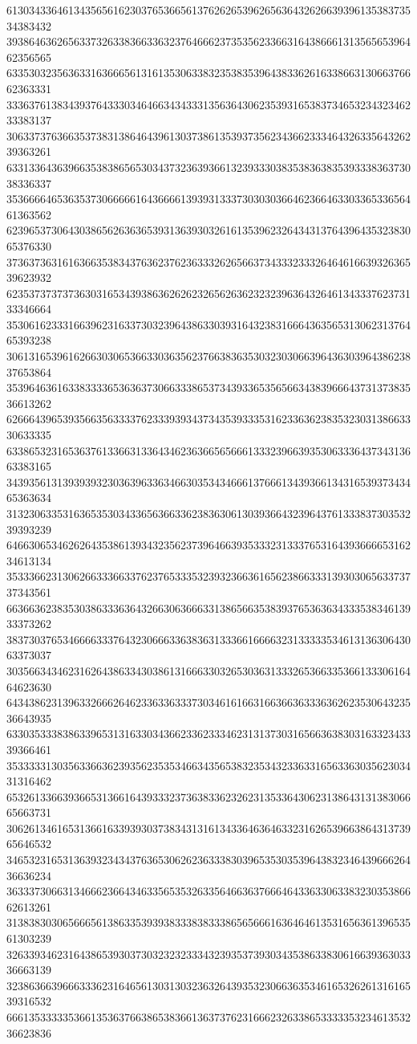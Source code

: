 61303433646134356561623037653665613762626539626563643262663939613538373534383432
39386463626563373263383663363237646662373535623366316438666131356565396462356565
63353032356363316366656131613530633832353835396438336261633866313066376662363331
33363761383439376433303464663434333135636430623539316538373465323432346233383137
30633737636635373831386464396130373861353937356234366233346432633564326239363261
63313364363966353838656530343732363936613239333038353836383539333836373038336337
35366664653635373066666164366661393931333730303036646236646330336533656461363562
62396537306430386562636365393136393032616135396232643431376439643532383065376330
37363736316163663538343763623762363332626566373433323332646461663932636539623932
62353737373736303165343938636262623265626362323239636432646134333762373133346664
35306162333166396231633730323964386330393164323831666436356531306231376465393238
30613165396162663030653663303635623766383635303230306639643630396438623837653864
35396463616338333365363637306633386537343933653565663438396664373137383536613262
62666439653935663563333762333939343734353933353162336362383532303138663330633335
63386532316536376133663133643462363665656661333239663935306333643734313663383165
34393561313939393230363963363466303534346661376661343936613431653937343465363634
31323063353163653530343365636633623836306130393664323964376133383730353239393239
64663065346262643538613934323562373964663935333231333765316439366665316234613134
35333662313062663336633762376533353239323663616562386633313930306563373737343561
66366362383530386333636432663063666331386566353839376536363433353834613933373262
38373037653466663337643230666336383631333661666632313333353461313630643063373037
30356634346231626438633430386131666330326530363133326536633536613330616464623630
64343862313963326662646233633633373034616166316636636333636262353064323536643935
63303533383863396531316330343662336233346231313730316566363830316332343339366461
35333331303563366362393562353534663435653832353432336331656336303562303431316462
65326133663936653136616439333237363833623262313533643062313864313138306665663731
30626134616531366163393930373834313161343364636463323162653966386431373965646532
34653231653136393234343763653062623633383039653530353964383234643966626436636234
36333730663134666236643463356535326335646636376664643363306338323035386662613261
31383830306566656138633539393833383833386565666163646461353165636139653561303239
32633934623164386539303730323232333432393537393034353863383061663936303336663139
32386366396663336231646561303130323632643935323066363534616532626131616539316532
66613533333536613536376638653836613637376231666232633865333335323461353236623836
